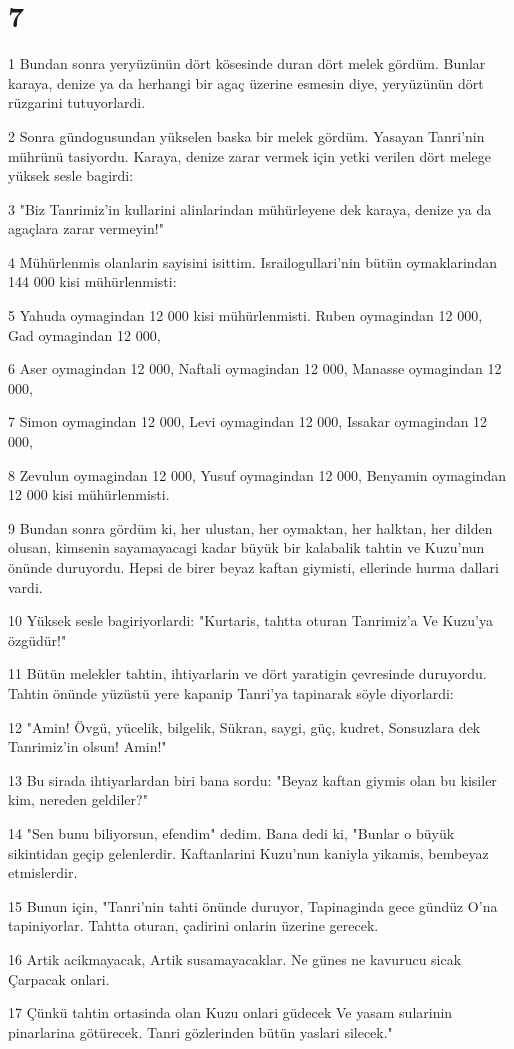 \chapter{7}

\par 1 Bundan sonra yeryüzünün dört kösesinde duran dört melek gördüm. Bunlar karaya, denize ya da herhangi bir agaç üzerine esmesin diye, yeryüzünün dört rüzgarini tutuyorlardi.
\par 2 Sonra gündogusundan yükselen baska bir melek gördüm. Yasayan Tanri'nin mührünü tasiyordu. Karaya, denize zarar vermek için yetki verilen dört melege yüksek sesle bagirdi:
\par 3 "Biz Tanrimiz'in kullarini alinlarindan mühürleyene dek karaya, denize ya da agaçlara zarar vermeyin!"
\par 4 Mühürlenmis olanlarin sayisini isittim. Israilogullari'nin bütün oymaklarindan 144 000 kisi mühürlenmisti:
\par 5 Yahuda oymagindan 12 000 kisi mühürlenmisti. Ruben oymagindan 12 000, Gad oymagindan 12 000,
\par 6 Aser oymagindan 12 000, Naftali oymagindan 12 000, Manasse oymagindan 12 000,
\par 7 Simon oymagindan 12 000, Levi oymagindan 12 000, Issakar oymagindan 12 000,
\par 8 Zevulun oymagindan 12 000, Yusuf oymagindan 12 000, Benyamin oymagindan 12 000 kisi mühürlenmisti.
\par 9 Bundan sonra gördüm ki, her ulustan, her oymaktan, her halktan, her dilden olusan, kimsenin sayamayacagi kadar büyük bir kalabalik tahtin ve Kuzu'nun önünde duruyordu. Hepsi de birer beyaz kaftan giymisti, ellerinde hurma dallari vardi.
\par 10 Yüksek sesle bagiriyorlardi: "Kurtaris, tahtta oturan Tanrimiz'a Ve Kuzu'ya özgüdür!"
\par 11 Bütün melekler tahtin, ihtiyarlarin ve dört yaratigin çevresinde duruyordu. Tahtin önünde yüzüstü yere kapanip Tanri'ya tapinarak söyle diyorlardi:
\par 12 "Amin! Övgü, yücelik, bilgelik, Sükran, saygi, güç, kudret, Sonsuzlara dek Tanrimiz'in olsun! Amin!"
\par 13 Bu sirada ihtiyarlardan biri bana sordu: "Beyaz kaftan giymis olan bu kisiler kim, nereden geldiler?"
\par 14 "Sen bunu biliyorsun, efendim" dedim. Bana dedi ki, "Bunlar o büyük sikintidan geçip gelenlerdir. Kaftanlarini Kuzu'nun kaniyla yikamis, bembeyaz etmislerdir.
\par 15 Bunun için, "Tanri'nin tahti önünde duruyor, Tapinaginda gece gündüz O'na tapiniyorlar. Tahtta oturan, çadirini onlarin üzerine gerecek.
\par 16 Artik acikmayacak, Artik susamayacaklar. Ne günes ne kavurucu sicak Çarpacak onlari.
\par 17 Çünkü tahtin ortasinda olan Kuzu onlari güdecek Ve yasam sularinin pinarlarina götürecek. Tanri gözlerinden bütün yaslari silecek."

